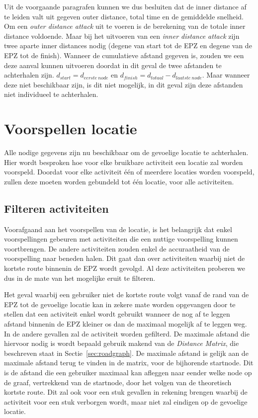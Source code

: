 Uit de voorgaande paragrafen kunnen we dus besluiten dat de inner distance af
te leiden valt uit gegeven outer distance, total time en de gemiddelde
snelheid. Om een \textit{outer distance attack} uit te voeren is de berekening
van de totale inner distance voldoende. Maar bij het uitvoeren van een
\textit{inner distance attack} zijn twee aparte inner distances nodig (degene
van start tot de \ac{EPZ} en degene van de \ac{EPZ} tot de finish). Wanneer de
cumulatieve afstand gegeven is, zouden we een deze aanval kunnen uitvoeren
doordat in dit geval de twee afstanden te achterhalen zijn. $d_{start} =
    d_{eerste\ node}$ en $d_{finish} = d_{totaal} - d_{laatste\ node}$. Maar
wanneer deze niet beschikbaar zijn, is dit niet mogelijk, in dit geval zijn
deze afstanden niet individueel te achterhalen.

\section{Voorspellen locatie}
Alle nodige gegevens zijn nu beschikbaar om de gevoelige locatie te
achterhalen. Hier wordt besproken hoe voor elke bruikbare activiteit een
locatie zal worden voorspeld. Doordat voor elke activiteit één of meerdere
locaties worden voorspeld, zullen deze moeten worden gebundeld tot één locatie,
voor alle activiteiten.

\subsection{Filteren activiteiten}
Voorafgaand aan het voorspellen van de locatie, is het belangrijk dat enkel
voorspellingen gebeuren met activiteiten die een nuttige voorspelling kunnen
voortbrengen. De andere activiteiten zouden enkel de accuraatheid van de
voorspelling naar beneden halen. Dit gaat dan over activiteiten waarbij niet de
kortste route binnenin de \ac{EPZ} wordt gevolgd. Al deze activiteiten proberen
we dus in de mate van het mogelijke eruit te filteren.

Het geval waarbij een gebruiker niet de kortste route volgt vanaf de rand van
de \ac{EPZ} tot de gevoelige locatie kan in zekere mate worden opgevangen door
te stellen dat een activiteit enkel wordt gebruikt wanneer de nog af te leggen
afstand binnenin de \ac{EPZ} kleiner os dan de maximaal mogelijk af te leggen
weg. In de andere gevallen zal de activiteit worden gefilterd. De maximale
afstand die hiervoor nodig is wordt bepaald gebruik makend van de
\textit{Distance Matrix}, die beschreven staat in Sectie~\ref{sec:roadgraph}.
De maximale afstand is gelijk aan de maximale afstand terug te vinden in de
matrix, voor de bijhorende startnode. Dit is de afstand die een gebruiker
maximaal kan afleggen naar eender welke node op de graaf, vertrekkend van de
startnode, door het volgen van de theoretisch kortste route. Dit zal ook voor
een stuk gevallen in rekening brengen waarbij de activiteit voor een stuk
verborgen wordt, maar niet zal eindigen op de gevoelige locatie.

